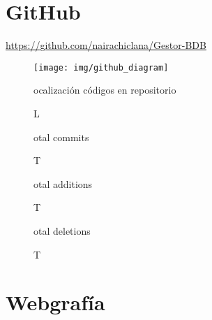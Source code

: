 \documentclass[12pt,a4paper]{article}
\begin{document}
\section{GitHub} \label{pto10}
\url{https://github.com/nairachiclana/Gestor-BDB}
\vspace{2em}

\begin{figure}[!h]
\centering
\texttt{[image: img/github\_diagram]}
\caption Localización códigos en repositorio
\label{git0}
\end{figure}

\begin{figure}[!h]
\centering
{}
\caption Total commits 
\label{git1}
\end{figure}

\begin{figure}[!h]
\centering
{}
\caption Total additions
\label{git2}
\end{figure}


\begin{figure}[!h]
\centering
{}
\caption Total deletions
\label{git3}
\end{figure}






\newpage

\section{Webgrafía} \label{pto11}
\end{document}
